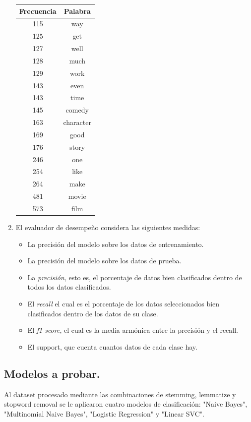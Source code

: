 \documentclass[11pt,letterpaper]{article}
\begin{document}
\begin{enumerate}
\begin{center}
\begin{tabular}{|c|c|}
\hline
Frecuencia & Palabra\\
\hline
115 & way\\
125 & get\\
127 & well\\
128 & much\\
129 & work\\
143 & even\\
143 & time\\
145 & comedy\\
163 & character\\
169 & good\\
176 & story\\
246 & one\\
254 & like\\
264 & make\\
481 & movie\\
573 & film\\
\hline
\end{tabular}
\end{center}
\item El evaluador de desempeño considera las siguientes medidas:
\begin{itemize}
\item La precisión del modelo sobre los datos de entrenamiento.
\item La precisión del modelo sobre los datos de prueba.
\item La \emph{precisión}, esto es, el porcentaje de datos bien clasificados dentro de
todos los datos clasificados.
\item El \emph{recall} el cual es el porcentaje de los datos seleccionados bien
clasificados dentro de los datos de su clase.
\item El \emph{f1-score}, el cual es la media armónica entre la precisión y el
recall.
\item El support, que cuenta cuantos datos de cada clase hay.
\end{itemize}
\end{enumerate}
\subsection{Modelos a probar.}
\label{sec:orgheadline2}
Al dataset procesado mediante las combinaciones de stemming, lemmatize y
stopword removal se le aplicaron cuatro modelos de clasificación: "Naive
Bayes", "Multinomial Naive Bayes", "Logistic Regression" y "Linear SVC". 
\end{document}
